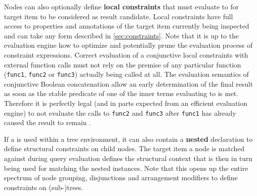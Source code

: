 \documentclass[11pt,a4paper]{article}
\begin{document}
Nodes can also optionally define \textbf{local constraints} that must evaluate to  for target item to be considered as result candidate.
Local constraints have full access to properties and annotations of the target item currently being inspected and can take any form described in \cref{sec:constraints}.
Note that it is up to the evaluation engine how to optimize and potentially prune the evaluation process of constraint expressions.
Correct evaluation of a conjunctive local constraints with external function calls  must not rely on the premise of any particular function (\texttt{func1}, \texttt{func2} or \texttt{func3}) actually being called at all.
The evaluation semantics of conjunctive Boolean concatenation allow an early determination of the final result as soon as the stable predicate of one of the inner terms evaluating to  is met.
Therefore it is perfectly legal (and in parts expected from an efficient evaluation engine) to not evaluate the calls to \texttt{func2} and \texttt{func3} after \texttt{func1} has already caused the result to remain .

If a  is used within a tree environment, it can also contain a \textbf{nested}  declaration to define structural constraints on child nodes.
The target item a node is matched against during query evaluation defines the structural context that is then in turn being used for matching the nested  instances.
Note that this opens up the entire spectrum of node grouping, disjunctions and arrangement modifiers to define constraints on (sub-)trees.
\end{document}
